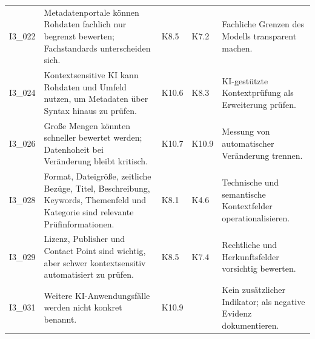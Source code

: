\begin{longtable}{p{0.9cm} p{6cm} p{0.9cm} p{0.9cm} p{6cm}}
I3\_022 & Metadatenportale können Rohdaten fachlich nur begrenzt bewerten; Fachstandards unterscheiden sich. & K8.5 & K7.2 & Fachliche Grenzen des Modells transparent machen. \\
I3\_024 & Kontextsensitive KI kann Rohdaten und Umfeld nutzen, um Metadaten über Syntax hinaus zu prüfen. & K10.6 & K8.3 & KI-gestützte Kontextprüfung als Erweiterung prüfen. \\
I3\_026 & Große Mengen könnten schneller bewertet werden; Datenhoheit bei Veränderung bleibt kritisch. & K10.7 & K10.9 & Messung von automatischer Veränderung trennen. \\
I3\_028 & Format, Dateigröße, zeitliche Bezüge, Titel, Beschreibung, Keywords, Themenfeld und Kategorie sind relevante Prüfinformationen. & K8.1 & K4.6 & Technische und semantische Kontextfelder operationalisieren. \\
I3\_029 & Lizenz, Publisher und Contact Point sind wichtig, aber schwer kontextsensitiv automatisiert zu prüfen. & K8.5 & K7.4 & Rechtliche und Herkunftsfelder vorsichtig bewerten. \\
I3\_031 & Weitere KI-Anwendungsfälle werden nicht konkret benannt. & K10.9 &  & Kein zusätzlicher Indikator; als negative Evidenz dokumentieren. \\

\end{longtable}